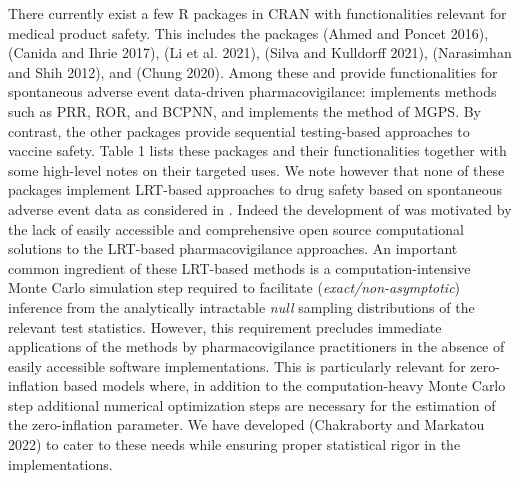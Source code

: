 There currently exist a few R packages in CRAN with functionalities relevant for medical product safety. This includes the packages  (Ahmed and Poncet 2016),  (Canida and Ihrie 2017),  (Li et al. 2021),  (Silva and Kulldorff 2021),  (Narasimhan and Shih 2012), and  (Chung 2020). Among these  and  provide functionalities for spontaneous adverse event data-driven pharmacovigilance:  implements methods such as PRR, ROR, and BCPNN, and  implements the method of MGPS. By contrast, the other packages provide sequential testing-based approaches to vaccine safety. Table 1 lists these packages and their functionalities together with some high-level notes on their targeted uses. We note however that none of these packages implement LRT-based approaches to drug safety based on spontaneous adverse event data as considered in . Indeed the development of  was motivated by the lack of easily accessible and comprehensive open source computational solutions to the LRT-based pharmacovigilance approaches. An important common ingredient of these LRT-based methods is a computation-intensive Monte Carlo simulation step required to facilitate (\emph{exact/non-asymptotic}) inference from the analytically intractable \emph{null} sampling distributions of the relevant test statistics. However, this requirement precludes immediate applications of the methods by pharmacovigilance practitioners in the absence of easily accessible software implementations. This is particularly relevant for zero-inflation based models where, in addition to the computation-heavy Monte Carlo step additional numerical optimization steps are necessary for the estimation of the zero-inflation parameter. We have developed  (Chakraborty and Markatou 2022) to cater to these needs while ensuring proper statistical rigor in the implementations.


